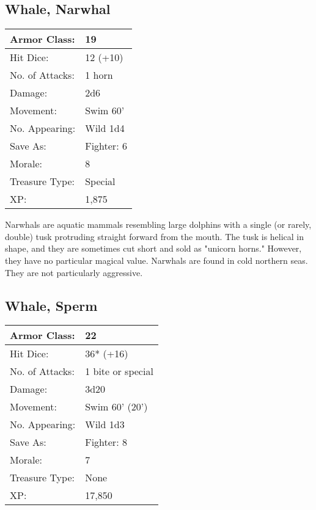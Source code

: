 \documentclass[a4paper,twoside,openany,10pt]{book}
\begin{document}
\begin{multicols}{2}
\subsection*{Whale, Narwhal}\label{whale-narwhal}

\begin{tabularx}{0.50\textwidth}{@{}lX@{}}
Armor Class: & 19 \\\hline
Hit Dice: & 12 (+10) \\\hline
No. of Attacks: & 1 horn \\\hline
Damage: & 2d6 \\\hline
Movement: & Swim 60' \\\hline
No. Appearing: & Wild 1d4 \\\hline
Save As: & Fighter: 6 \\\hline
Morale: & 8 \\\hline
Treasure Type: & Special \\\hline
XP: & 1,875 \\\hline
\end{tabularx}\medskip

Narwhals are aquatic mammals resembling large dolphins with a single (or rarely, double) tusk protruding straight forward from the mouth. The tusk is helical in shape, and they are sometimes cut short and sold as "unicorn horns." However, they have no particular magical value. Narwhals are found in cold northern seas. They are not particularly aggressive.

\subsection*{Whale, Sperm}\label{whale-sperm}

\begin{tabularx}{0.50\textwidth}{@{}lX@{}}
Armor Class: & 22 \\\hline
Hit Dice: & 36* (+16)  \\\hline
No. of Attacks: & 1 bite or special \\\hline
Damage: & 3d20 \\\hline
Movement: & Swim 60' (20') \\\hline
No. Appearing: & Wild 1d3 \\\hline
Save As: & Fighter: 8 \\\hline
Morale: & 7 \\\hline
Treasure Type: & None \\\hline
XP: & 17,850 \\\hline
\end{tabularx}


\end{multicols}
\end{document}
